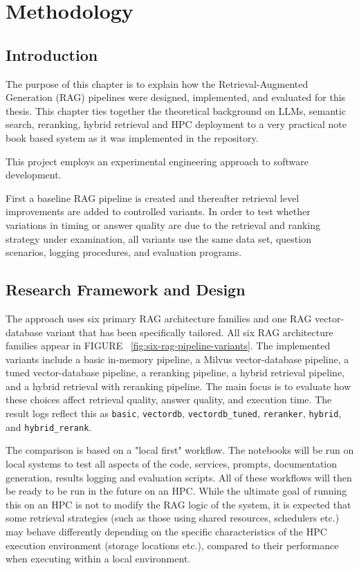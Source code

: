 \chapter{Methodology}

\section{Introduction}
The purpose of this chapter is to explain how the Retrieval-Augmented Generation (RAG) pipelines were designed, implemented, and evaluated for this thesis. This chapter ties together the theoretical background on LLMs, semantic search, reranking, hybrid retrieval and HPC deployment to a very practical note book based system as it was implemented in the repository.

This project employs an experimental engineering approach to software development. 

First a baseline RAG pipeline is created and thereafter retrieval level improvements are added to controlled variants. In order to test whether variations in timing or answer quality are due to the retrieval and ranking strategy under examination, all variants use the same data set, question scenarios, logging procedures, and evaluation programs.

\section{Research Framework and Design}

The approach uses six primary RAG architecture families and one RAG vector-database variant that has been specifically tailored. All six RAG architecture families appear in FIGURE ~\ref{fig:six-rag-pipeline-variants}. The implemented variants include a basic in-memory pipeline, a Milvus vector-database pipeline, a tuned vector-database pipeline, a reranking pipeline, a hybrid retrieval pipeline, and a hybrid retrieval with reranking pipeline. The main focus is to evaluate how these choices affect retrieval quality, answer quality, and execution time. The result logs reflect this as \texttt{basic}, \texttt{vectordb}, \texttt{vectordb\_\allowbreak tuned}, \texttt{reranker}, \texttt{hybrid}, and \texttt{hybrid\_\allowbreak rerank}.

The comparison is based on a "local first" workflow. The notebooks will be run on local systems to test all aspects of the code, services, prompts, documentation generation, results logging and evaluation scripts. All of these workflows will then be ready to be run in the future on an \ac{HPC}. While the ultimate goal of running this on an \ac{HPC} is not to modify the \ac{RAG} logic of the system, it is expected that some retrieval strategies (such as those using shared resources, schedulers etc.) may behave differently depending on the specific characteristics of the HPC execution environment (storage locations etc.), compared to their performance when executing within a local environment.

